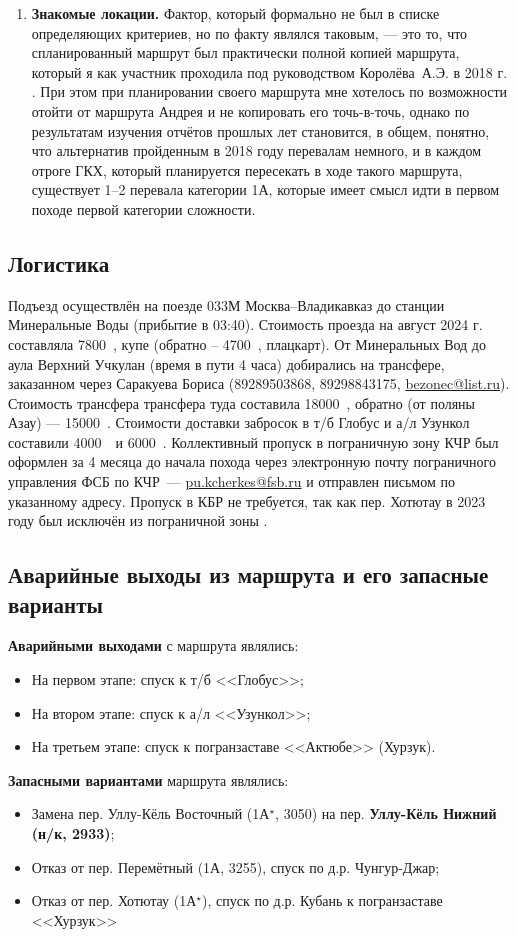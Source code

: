 \begin{enumerate}
	\item\textbf{ Знакомые локации.}
	Фактор, который формально не был в списке определяющих критериев, но по факту являлся таковым, — это то, что спланированный маршрут был практически полной копией маршрута, который я как участник проходила под руководством Королёва~А.Э. в 2018 г. \cite{Korolyov2018}. При этом при планировании своего маршрута мне хотелось по возможности отойти от маршрута Андрея и не копировать его точь-в-точь, однако по результатам изучения отчётов прошлых лет становится, в общем, понятно, что альтернатив пройденным в 2018 году перевалам немного, и в каждом отроге ГКХ, который планируется пересекать в ходе такого маршрута, существует 1–2 перевала категории 1А, которые имеет смысл идти в первом походе первой категории сложности.
\end{enumerate} 
\subsection{Логистика}
Подъезд осуществлён на поезде 033М Москва--Владикавказ до станции Минеральные Воды (прибытие в 03:40). Стоимость проезда на август 2024 г. составляла 7800~\faRub, купе (обратно – 4700~\faRub, плацкарт). От Минеральных Вод до аула Верхний Учкулан (время в пути 4 часа) добирались на трансфере, заказанном через Саракуева Бориса (89289503868, 89298843175,  \href{mailto: bezonec@list.ru}{bezonec@list.ru}). Стоимость трансфера трансфера туда составила 18000~\faRub, обратно (от поляны Азау) — 15000~\faRub. Стоимости доставки забросок в т/б Глобус и а/л Узункол составили 4000~\faRub~и 6000~\faRub.
Коллективный пропуск в пограничную зону КЧР был оформлен за 4 месяца до начала похода через электронную почту пограничного управления ФСБ по КЧР~--- \href{mailto: pu.kcherkes@fsb.ru}{pu.kcherkes@fsb.ru} и отправлен письмом по указанному адресу. Пропуск в КБР не требуется, так как пер. Хотютау в 2023 году был исключён из пограничной зоны \cite{order_kbr}.
\subsection{Аварийные выходы из маршрута и его запасные варианты}
\textbf{Аварийными выходами} с маршрута являлись:
\begin{itemize}
	\item На первом этапе: спуск к т/б <<Глобус>>;
	\item На втором этапе: спуск к а/л <<Узункол>>;
	\item На третьем этапе: спуск к погранзаставе <<Актюбе>> (Хурзук).
\end{itemize}
\textbf{Запасными вариантами} маршрута являлись:
\begin{itemize}
	\item Замена пер. Уллу-Кёль Восточный (1А$^\star$, 3050) на пер. \textbf{Уллу-Кёль Нижний (н/к, 2933)};
	\item Отказ от пер. Перемётный (1А, 3255), спуск по д.р. Чунгур-Джар;
	\item Отказ от пер. Хотютау (1А$^\star$), спуск по д.р. Кубань к погранзаставе <<Хурзук>>
\end{itemize}
